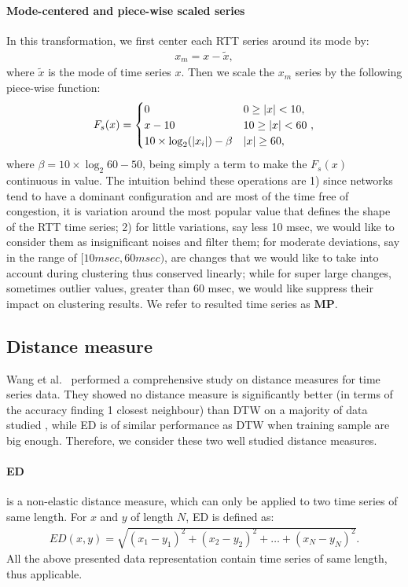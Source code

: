 \paragraph*{Mode-centered and piece-wise scaled series}  In this transformation, we first center each RTT series around its mode by:
\begin{align*}
x_m = x-\tilde x,
\end{align*}
where $\tilde x$ is the mode of time series $x$. Then we scale the $x_m$ series by the following piece-wise function:
\begin{align*}
F_s(x) =
\begin{cases} 
       0    \hfill & \text{$0 \geq |x| < 10$}, \\
       x-10 \hfill & \text{$10 \geq |x| < 60$ }, \\
       10 \times \log_2 (|x_i|) - \beta \hfill & \text{$|x|\geq 60$},\\
  \end{cases}
\end{align*}
where $\beta = 10 \times \log_2 60 - 50$, being simply a term to make the $F_s(x)$ continuous in value. 
The intuition behind these operations are 1) since networks tend to have a dominant configuration and are most of the time free of congestion, it is variation around the most popular value that defines the shape of the RTT time series; 2) for little variations, say less 10 msec, we would like to consider them as insignificant noises and filter them; for moderate deviations, say in the range of $[10 msec, 60 msec)$, are changes that we would like to take into account during clustering thus conserved linearly; while for super large changes, sometimes outlier values, greater than 60 msec, we would like suppress their impact on clustering results. We refer to resulted time series as \textbf{MP}.

\subsection{Distance measure}
Wang et al.\ \cite{Wang2013} performed a comprehensive study on distance measures for time series data. They showed no distance measure is significantly better (in terms of the accuracy finding 1 closest neighbour) than \acf{DTW} on a majority of data studied \cite{UCRArchive}, while \ac{ED} is of similar performance as \acf{DTW} when training sample are big enough. Therefore, we consider these two well studied distance measures.

\paragraph*{\ac{ED}} is a non-elastic distance measure, which can only be applied to two time series of same length. For $x$ and $y$ of length $N$, ED is defined as:
\begin{align}
ED(x,y) = \sqrt{(x_1 - y_1)^2 + (x_2 - y_2)^2 + \dots + (x_N - y_N)^2}.
\end{align}
All the above presented data representation contain time series of same length, thus applicable.

